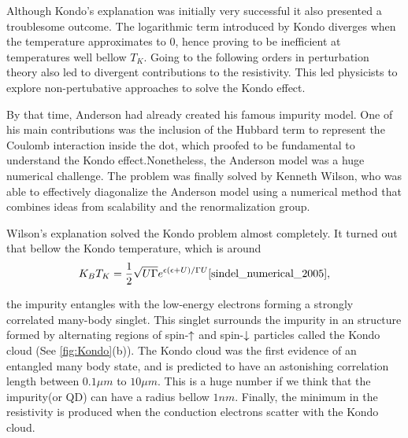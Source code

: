 Although Kondo's explanation was initially very successful it also presented a troublesome outcome. The logarithmic term introduced by Kondo diverges when the temperature approximates to $0$, hence proving to be inefficient at temperatures well bellow $T_K$. Going to the following orders in perturbation theory also led to divergent contributions to the  resistivity. This led physicists  to explore non-pertubative approaches to solve the Kondo effect. 

By that time, Anderson had already created his famous impurity model. One of his main contributions was the inclusion of the Hubbard term to represent the Coulomb interaction inside the dot, which proofed to be fundamental to understand the Kondo effect.Nonetheless, the Anderson model was a huge numerical challenge. The problem was finally solved by Kenneth Wilson, who was able to effectively diagonalize the Anderson model using a numerical method that combines ideas from scalability and the renormalization group. 

Wilson's explanation solved the Kondo problem almost completely. It turned out that bellow the Kondo temperature, which is  around
\begin{equation}
K_BT_K = \frac{1}{2}\sqrt{U\Gamma}e^{\epsilon(\epsilon+U)/\Gamma U} \text{\cite{sindel_numerical_2005}},
\end{equation}

\noindent the impurity entangles with the low-energy electrons forming a strongly correlated many-body singlet. This singlet surrounds the impurity in an structure formed by alternating regions of spin-$\uparrow$ and spin-$\downarrow$ particles called the Kondo cloud (See \ref{fig:Kondo}(b)). The Kondo cloud was the first evidence of an entangled many body state, and is predicted to have an astonishing correlation length between $0.1\mu m$ to $10 \mu m$. This is a huge number if we think that the impurity(or QD) can have a radius bellow $1nm$. Finally, the minimum in the resistivity is produced when the conduction electrons scatter with the Kondo cloud. 









